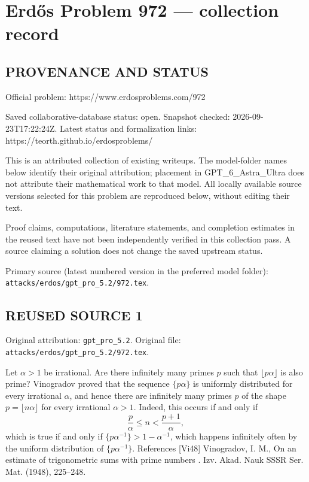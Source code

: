\section*{Erd\H{o}s Problem 972 --- collection record}

\subsection*{PROVENANCE AND STATUS}
Official problem: https://www.erdosproblems.com/972

Saved collaborative-database status: open.
Snapshot checked: 2026-09-23T17:22:24Z.
Latest status and formalization links: https://teorth.github.io/erdosproblems/

This is an attributed collection of existing writeups. The model-folder names below identify their original attribution; placement in GPT\_6\_Astra\_Ultra does not attribute their mathematical work to that model. All locally available source versions selected for this problem are reproduced below, without editing their text.

Proof claims, computations, literature statements, and completion estimates in the reused text have not been independently verified in this collection pass. A source claiming a solution does not change the saved upstream status.

Primary source (latest numbered version in the preferred model folder): \texttt{attacks/erdos/gpt\_pro\_5.2/972.tex}.

\subsection*{REUSED SOURCE 1}
Original attribution: \texttt{gpt\_pro\_5.2}.
Original file: \texttt{attacks/erdos/gpt\_pro\_5.2/972.tex}.


Let $\alpha>1$ be irrational. Are there infinitely many primes $p$ such that $\lfloor p\alpha\rfloor$ is also prime? Vinogradov \cite{Vi48} proved that the sequence $\{p\alpha\}$ is uniformly distributed for every irrational $\alpha$, and hence there are infinitely many primes $p$ of the shape $p=\lfloor n\alpha\rfloor$ for every irrational $\alpha>1$. Indeed, this occurs if and only if\[\frac{p}{\alpha}\leq n<\frac{p+1}{\alpha},\]which is true if and only if $\{p\alpha^{-1}\}>1-\alpha^{-1}$, which happens infinitely often by the uniform distribution of $\{p\alpha^{-1}\}$. References [Vi48] Vinogradov, I. M., On an estimate of trigonometric sums with prime numbers . Izv. Akad. Nauk SSSR Ser. Mat. (1948), 225--248.


